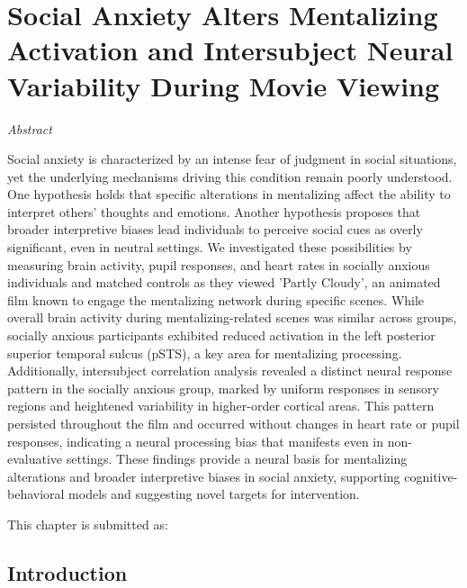\chapter{Social Anxiety Alters Mentalizing Activation and Intersubject Neural Variability During Movie Viewing}
\label{ch:mentalizing_sa}

\vspace{-1cm}
\begin{center}
    \large\textit{Abstract}
\end{center} 

{\abstractfont 
Social anxiety is characterized by an intense fear of judgment in social situations, yet the underlying mechanisms driving this condition remain poorly understood. One hypothesis holds that specific alterations in mentalizing affect the ability to interpret others' thoughts and emotions. Another hypothesis proposes that broader interpretive biases lead individuals to perceive social cues as overly significant, even in neutral settings. We investigated these possibilities by measuring brain activity, pupil responses, and heart rates in socially anxious individuals and matched controls as they viewed 'Partly Cloudy', an animated film known to engage the mentalizing network during specific scenes. While overall brain activity during mentalizing-related scenes was similar across groups, socially anxious participants exhibited reduced activation in the left posterior superior temporal sulcus (pSTS), a key area for mentalizing processing. Additionally, intersubject correlation analysis revealed a distinct neural response pattern in the socially anxious group, marked by uniform responses in sensory regions and heightened variability in higher-order cortical areas. This pattern persisted throughout the film and occurred without changes in heart rate or pupil responses, indicating a neural processing bias that manifests even in non-evaluative settings. These findings provide a neural basis for mentalizing alterations and broader interpretive biases in social anxiety, supporting cognitive-behavioral models and suggesting novel targets for intervention.
}  

\vspace{2cm}
This chapter is submitted as: 

\thispagestyle{empty}

\newpage

\section{Introduction}

